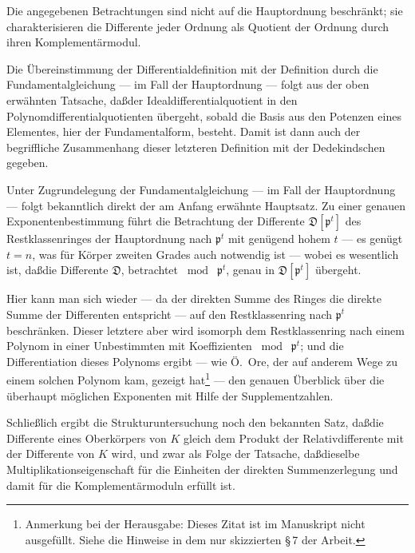 \documentclass[10pt,a4paper]{article}
\theoremstyle{plain}
\theoremstyle{definition}
\theoremstyle{remark}
\newcommand{\idp}{\mathfrak{p}}
\newcommand{\idD}{\mathfrak{D}}
\begin{document}
Die angegebenen Betrachtungen sind nicht auf die Hauptordnung beschr\"ankt; sie charakterisieren die Differente jeder Ordnung als Quotient der Ordnung durch ihren Komplement\"armodul.

Die \"Ubereinstimmung der Differentialdefinition mit der Definition durch die Fundamentalgleichung --- im Fall der Hauptordnung --- folgt aus der oben erw\"ahnten Tatsache, da\ss  der Idealdifferentialquotient in den Polynomdifferentialquotienten \"ubergeht, sobald die Basis aus den Potenzen eines Elementes, hier der Fundamentalform, besteht. Damit ist dann auch der begriffliche Zusammenhang dieser letzteren Definition mit der Dedekindschen gegeben.

Unter Zugrundelegung der Fundamentalgleichung --- im Fall der Hauptordnung --- folgt bekanntlich direkt der am Anfang erw\"ahnte Hauptsatz. Zu einer genauen Exponentenbestimmung f\"uhrt die Betrachtung der Differente $\idD[\idp^t]$ des Restklassenringes der Hauptordnung nach $\idp^t$ mit gen\"ugend hohem $t$ --- es gen\"ugt $t=n$, was f\"ur K\"orper zweiten Grades auch notwendig ist --- wobei es wesentlich ist, da\ss  die Differente $\idD$, betrachtet $\bmod\;\idp^t$, genau in $\idD[\idp^t]$ \"ubergeht.

Hier kann man sich wieder --- da der direkten Summe des Ringes die direkte Summe der Differenten entspricht --- auf den Restklassenring nach $\idp^t$ beschr\"anken. Dieser letztere aber wird isomorph dem Restklassenring nach einem Polynom in einer Unbestimmten mit Koeffizienten $\bmod\;\idp^t$; und die Differentiation dieses Polynoms ergibt --- wie \"O.\ Ore, der auf anderem Wege zu einem solchen Polynom kam, gezeigt hat\footnote{Anmerkung bei der Herausgabe: Dieses Zitat ist im Manuskript nicht ausgef\"ullt. Siehe die Hinweise in dem nur skizzierten \S\,7 der Arbeit.} --- den genauen \"Uberblick \"uber die \"uberhaupt m\"oglichen Exponenten mit Hilfe der Supplementzahlen.

Schlie\ss lich ergibt die Strukturuntersuchung noch den bekannten Satz, da\ss  die Differente eines Oberk\"orpers von $K$ gleich dem Produkt der Relativdifferente mit der Differente von $K$ wird, und zwar als Folge der Tatsache, da\ss  dieselbe Multiplikationseigenschaft f\"ur die Einheiten der direkten Summenzerlegung und damit f\"ur die Komplement\"armoduln erf\"ullt ist.
\end{document}
